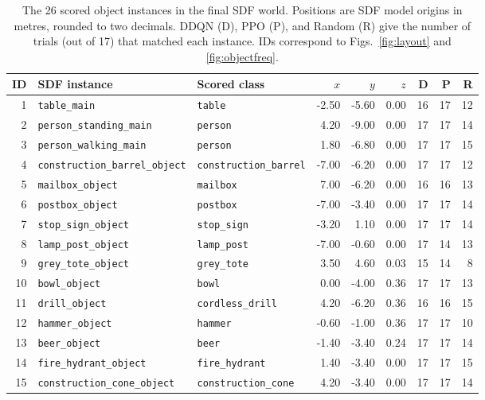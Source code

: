 \documentclass[conference]{IEEEtran}
\begin{document}
\begin{table}[t]
\caption{The 26 scored object instances in the final SDF world. Positions are SDF model origins in metres, rounded to two decimals. DDQN (D), PPO (P), and Random (R) give the number of trials (out of 17) that matched each instance. IDs correspond to Figs.~\ref{fig:layout} and \ref{fig:objectfreq}.}
\label{tab:inventory}
\centering\scriptsize
\setlength{\tabcolsep}{3pt}
\begin{tabular}{@{}rllrrrrrr@{}}
\toprule
ID & SDF instance & Scored class & $x$ & $y$ & $z$ & D & P & R \\ \midrule
1 & \texttt{table\_main} & \texttt{table} & -2.50 & -5.60 & 0.00 & 16 & 17 & 12 \\
2 & \texttt{person\_standing\_main} & \texttt{person} & 4.20 & -9.00 & 0.00 & 17 & 17 & 14 \\
3 & \texttt{person\_walking\_main} & \texttt{person} & 1.80 & -6.80 & 0.00 & 17 & 17 & 15 \\
4 & \texttt{construction\_barrel\_object} & \texttt{construction\_barrel} & -7.00 & -6.20 & 0.00 & 17 & 17 & 12 \\
5 & \texttt{mailbox\_object} & \texttt{mailbox} & 7.00 & -6.20 & 0.00 & 16 & 16 & 13 \\
6 & \texttt{postbox\_object} & \texttt{postbox} & -7.00 & -3.40 & 0.00 & 17 & 17 & 14 \\
7 & \texttt{stop\_sign\_object} & \texttt{stop\_sign} & -3.20 & 1.10 & 0.00 & 17 & 17 & 14 \\
8 & \texttt{lamp\_post\_object} & \texttt{lamp\_post} & -7.00 & -0.60 & 0.00 & 17 & 14 & 13 \\
9 & \texttt{grey\_tote\_object} & \texttt{grey\_tote} & 3.50 & 4.60 & 0.03 & 15 & 14 & 8 \\
10 & \texttt{bowl\_object} & \texttt{bowl} & 0.00 & -4.00 & 0.36 & 17 & 17 & 13 \\
11 & \texttt{drill\_object} & \texttt{cordless\_drill} & 4.20 & -6.20 & 0.36 & 16 & 16 & 15 \\
12 & \texttt{hammer\_object} & \texttt{hammer} & -0.60 & -1.00 & 0.36 & 17 & 17 & 10 \\
13 & \texttt{beer\_object} & \texttt{beer} & -1.40 & -3.40 & 0.24 & 17 & 17 & 14 \\
14 & \texttt{fire\_hydrant\_object} & \texttt{fire\_hydrant} & 1.40 & -3.40 & 0.00 & 17 & 17 & 15 \\
15 & \texttt{construction\_cone\_object} & \texttt{construction\_cone} & 4.20 & -3.40 & 0.00 & 17 & 17 & 14 \\

\end{tabular}
\end{table}
\end{document}
